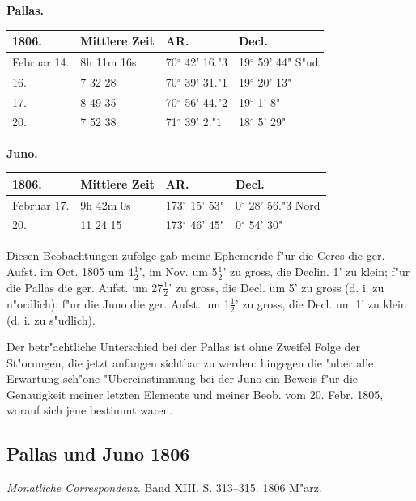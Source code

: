 \documentclass[12pt,a4paper]{article}
\begin{document}
\textbf{Pallas.}

\begin{table}[H]
\centering
\begin{tabular}{l l l l}
\toprule
1806. & Mittlere Zeit & AR. & Decl. \\
\midrule
Februar 14. & 8h 11m 16s & 70$^\circ$ 42' 16."3 & 19$^\circ$ 59' 44" S"ud \\
16. & 7 32 28 & 70$^\circ$ 39' 31."1 & 19$^\circ$ 20' 13" \\
17. & 8 49 35 & 70$^\circ$ 56' 44."2 & 19$^\circ$ 1' 8" \\
20. & 7 52 38 & 71$^\circ$ 39' 2."1 & 18$^\circ$ 5' 29" \\
\bottomrule
\end{tabular}
\end{table}

\textbf{Juno.}

\begin{table}[H]
\centering
\begin{tabular}{l l l l}
\toprule
1806. & Mittlere Zeit & AR. & Decl. \\
\midrule
Februar 17. & 9h 42m 0s & 173$^\circ$ 15' 53" & 0$^\circ$ 28' 56."3 Nord \\
20. & 11 24 15 & 173$^\circ$ 46' 45" & 0$^\circ$ 54' 30" \\
\bottomrule
\end{tabular}
\end{table}

Diesen Beobachtungen zufolge gab meine Ephemeride f"ur die Ceres die ger. Aufst. im Oct. 1805 um 4$\frac{1}{2}$', im Nov. um 5$\frac{1}{2}$' zu gross, die Declin. 1' zu klein; f"ur die Pallas die ger. Aufst. um 27$\frac{1}{2}$' zu gross, die Decl. um 5' zu gross (d. i. zu n"ordlich); f"ur die Juno die ger. Aufst. um 1$\frac{1}{2}$' zu gross, die Decl. um 1' zu klein (d. i. zu s"udlich).

Der betr"achtliche Unterschied bei der Pallas ist ohne Zweifel Folge der St"orungen, die jetzt anfangen sichtbar zu werden: hingegen die "uber alle Erwartung sch"one "Ubereinstimmung bei der Juno ein Beweis f"ur die Genauigkeit meiner letzten Elemente und meiner Beob. vom 20. Febr. 1805, worauf sich jene bestimmt waren.

\subsection{Pallas und Juno 1806}

\textit{Monatliche Correspondenz.} Band XIII. S. 313--315. 1806 M"arz.
\end{document}
